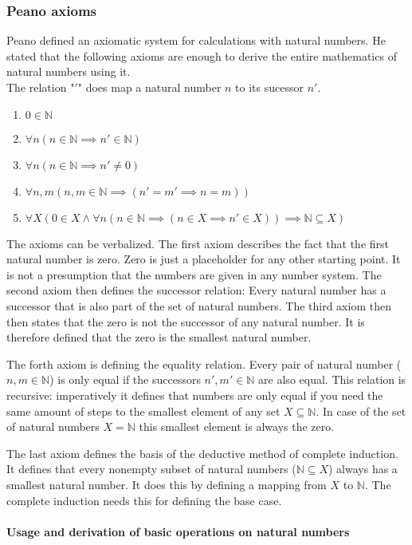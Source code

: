 \documentclass[english,12pt]{article}
\begin{document}
\subsubsection{Peano axioms}
Peano defined an axiomatic system for calculations with natural numbers. He stated that the following axioms are enough to derive the entire mathematics of natural numbers using it. \\
The relation "$'$" does map a natural number $n$ to its sucessor $n'$.
\begin{enumerate}
    \item $0 \in \mathbb{N}$
    \item $\forall n (n \in \mathbb{N} \implies n' \in \mathbb{N})$
    \item $\forall n (n \in \mathbb{N} \implies n' \neq 0)$
    \item $\forall n, m (n, m \in \mathbb{N} \implies (n' = m' \implies n = m))$
    \item $\displaystyle \forall X(0\in X\land \forall n(n\in \mathbb{N} \implies (n\in X\implies n'\in X))\implies \mathbb{N} \subseteq X) $
\end{enumerate}
The axioms can be verbalized. The first axiom describes the fact that the first natural number is zero. Zero is just a placeholder for any other starting point. It is not a presumption that the numbers are given in any number system. The second axiom then defines the successor relation: Every natural number has a successor that is also part of the set of natural numbers. The third axiom then then states that the zero is not the successor of any natural number. It is therefore defined that the zero is the smallest natural number.

The forth axiom is defining the equality relation. Every pair of natural number ($n, m \in \mathbb{N}$) is only equal if the successors $n', m' \in \mathbb{N}$ are also equal. This relation is recursive: imperatively it defines that numbers are only equal if you need the same amount of steps to the smallest element of any set $X \subseteq \mathbb{N}$. In case of the set of natural numbers $X = \mathbb{N}$ this smallest element is always the zero.

The last axiom defines the basis of the deductive method of complete induction. It defines that every nonempty subset of natural numbers ($\mathbb{N} \subseteq X$) always has a smallest natural number. It does this by defining a mapping from $X$ to $\mathbb{N}$. The complete induction needs this for defining the base case.
\paragraph{Usage and derivation of basic operations on natural numbers}
\end{document}
